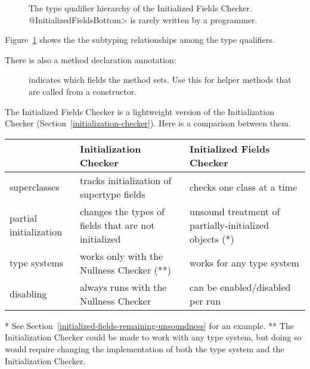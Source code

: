 \begin{figure}
\caption{The type qualifier hierarchy of the Initialized Fields Checker.
\<@InitializedFieldsBottom> is rarely written by a programmer.}
\label{fig-initialized-fields-hierarchy}
\end{figure}

Figure~\ref{fig-initialized-fields-hierarchy} shows the the subtyping
relationships among the type qualifiers.

There is also a method declaration annotation:

\begin{description}
\item[]
  indicates which fields the method sets.  Use this for helper methods that
  are called from a constructor.
\end{description}



The Initialized Fields Checker is a lightweight version of the  Initialization Checker
(Section~\ref{initialization-checker}).  Here is a comparison between them.

\noindent
\begin{small}
\begin{tabular}{| l | l | l |}
 \hline
 & Initialization Checker & Initialized Fields Checker
 \\ \hline
 superclasses
 & tracks initialization of supertype fields
 & checks one class at a time
 \\
 partial initialization
 & changes the types of fields that are not initialized
 & unsound treatment of partially-initialized objects (*)
 \\
 type systems
 & works only with the Nullness Checker (**)
 & works for any type system
 \\
 disabling
 & always runs with the Nullness Checker
 & can be enabled/disabled per run
 \\
 \hline
\end{tabular}

\noindent
* See Section~\ref{initialized-fields-remaining-unsoundness} for an example.
\newline
** The Initialization Checker could be made to work with any type system, but
doing so would require changing the implementation of both the type system and
the Initialization Checker.
\end{small}


